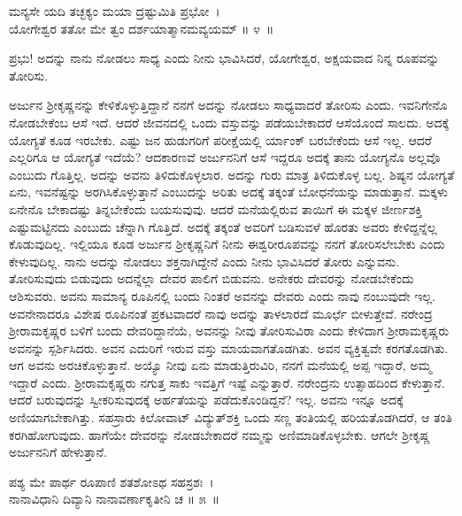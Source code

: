 \begin{shloka}
ಮನ್ಯಸೇ ಯದಿ ತಚ್ಛಕ್ಯಂ ಮಯಾ ದ್ರಷ್ಟುಮಿತಿ ಪ್ರಭೋ~।\\ಯೋಗೇಶ್ವರ ತತೋ ಮೇ ತ್ವಂ ದರ್ಶಯಾತ್ಮಾನಮವ್ಯಯಮ್ \hfill॥ ೪~॥
\end{shloka}

\begin{artha}
ಪ್ರಭು! ಅದನ್ನು ನಾನು ನೋಡಲು ಸಾಧ್ಯ ಎಂದು ನೀನು ಭಾವಿಸಿದರೆ, ಯೋಗೇಶ್ವರ, ಅಕ್ಷಯವಾದ ನಿನ್ನ ರೂಪವನ್ನು ತೋರಿಸು.
\end{artha}

ಅರ್ಜುನ ಶ‍್ರೀಕೃಷ್ಣನನ್ನು ಕೇಳಿಕೊಳ್ಳುತ್ತಿದ್ದಾನೆ ನನಗೆ ಅದನ್ನು ನೋಡಲು ಸಾಧ್ಯವಾದರೆ ತೋರಿಸು ಎಂದು. ಇವನಿಗೇನೊ ನೋಡಬೇಕೆಂಬ ಆಸೆ ಇದೆ. ಆದರೆ ಜೀವನದಲ್ಲಿ ಒಂದು ವಸ್ತುವನ್ನು ಪಡೆಯಬೇಕಾದರೆ ಆಸೆಯೊಂದೆ ಸಾಲದು. ಅದಕ್ಕೆ ಯೋಗ್ಯತೆ ಕೂಡ ಇರಬೇಕು. ಎಷ್ಟು ಜನ ಹುಡುಗರಿಗೆ ಪರೀಕ್ಷೆಯಲ್ಲಿ ರ್ಯಾಂಕ್ ಬರಬೇಕೆಂದು ಆಸೆ ಇಲ್ಲ. ಆದರೆ ಎಲ್ಲರಿಗೂ ಆ ಯೋಗ್ಯತೆ ಇದೆಯೆ? ಆದಕಾರಣವೆ ಅರ್ಜುನನಿಗೆ ಆಸೆ ಇದ್ದರೂ ಅದಕ್ಕೆ ತಾನು ಯೋಗ್ಯನೊ ಅಲ್ಲವೊ ಎಂಬುದು ಗೊತ್ತಿಲ್ಲ. ಅದನ್ನು ಅವನು ತಿಳಿದುಕೊಳ್ಳಲಾರ. ಅದನ್ನು ಗುರು ಮಾತ್ರ ತಿಳಿದುಕೊಳ್ಳ ಬಲ್ಲ. ಶಿಷ್ಯನ ಯೋಗ್ಯತೆ ಏನು, ಇವನೆಷ್ಟನ್ನು ಅರಗಿಸಿಕೊಳ್ಳುತ್ತಾನೆ ಎಂಬುದನ್ನು ಅರಿತು ಅದಕ್ಕೆ ತಕ್ಕಂತೆ ಬೋಧನೆಯನ್ನು ಮಾಡುತ್ತಾನೆ. ಮಕ್ಕಳು ಏನೇನೊ ಬೇಕಾದಷ್ಟು ತಿನ್ನಬೇಕೆಂದು ಬಯಸುವುವು. ಆದರೆ ಮನೆಯಲ್ಲಿರುವ ತಾಯಿಗೆ ಈ ಮಕ್ಕಳ ಜೀರ್ಣಶಕ್ತಿ ಎಷ್ಟುಮಟ್ಟಿನದು ಎಂಬುದು ಚೆನ್ನಾಗಿ ಗೊತ್ತಿದೆ. ಅದಕ್ಕೆ ತಕ್ಕಂತೆ ಅವರಿಗೆ ಬಡಿಸುವಳೆ ಹೊರತು ಅವರು ಕೇಳಿದ್ದನ್ನೆಲ್ಲ ಕೊಡುವುದಿಲ್ಲ. ಇಲ್ಲಿಯೂ ಕೂಡ ಅರ್ಜುನ ಶ‍್ರೀಕೃಷ್ಣನಿಗೆ ನೀನು ಈಶ್ವರೀರೂಪವನ್ನು ನನಗೆ ತೋರಿಸಲೇಬೇಕು ಎಂದು ಕೇಳುವುದಿಲ್ಲ. ನಾನು ಅದನ್ನು ನೋಡಲು ಶಕ್ತನಾಗಿದ್ದೇನೆ ಎಂದು ನೀನು ಭಾವಿಸಿದರೆ ತೋರು ಎನ್ನುವನು. ತೋರಿಸುವುದು ಬಿಡುವುದು ಅದನ್ನೆಲ್ಲಾ ದೇವರ ಪಾಲಿಗೆ ಬಿಡುವನು. ಅನೇಕರು ದೇವರನ್ನು ನೋಡಬೇಕೆಂದು ಆಶಿಸುವರು. ಅವನು ಸಾಮಾನ್ಯ ರೂಪಿನಲ್ಲಿ ಬಂದು ನಿಂತರೆ ಅವನನ್ನು ದೇವರು ಎಂದು ನಾವು ನಂಬುವುದೇ ಇಲ್ಲ. ಅವನೇನಾದರೂ ವಿಶೇಷ ರೂಪಿನಂತೆ ಪ್ರಕಟವಾದರೆ ನಾವು ಅದನ್ನು ತಾಳಲಾರದೆ ಮೂರ್ಛೆ ಬೀಳುತ್ತೇವೆ. ನರೇಂದ್ರ ಶ‍್ರೀರಾಮಕೃಷ್ಣರ ಬಳಿಗೆ ಬಂದು ದೇವರಿದ್ದಾನೆಯೆ, ಅವನನ್ನು ನೀವು ತೋರಿಸುವಿರಾ ಎಂದು ಕೇಳಿದಾಗ ಶ‍್ರೀರಾಮಕೃಷ್ಣರು ಅವನನ್ನು ಸ್ಪರ್ಶಿಸಿದರು. ಅವನ ಎದುರಿಗೆ ಇರುವ ವಸ್ತು ಮಾಯವಾಗತೊಡಗಿತು. ಅವನ ವ್ಯಕ್ತಿತ್ವವೇ ಕರಗತೊಡಗಿತು. ಆಗ ಅವನು ಅರಚಿಕೊಳ್ಳುತ್ತಾನೆ. ಅಯ್ಯೊ ನೀವು ಏನು ಮಾಡುತ್ತಿರುವಿರಿ, ನನಗೆ ಮನೆಯಲ್ಲಿ ಅಪ್ಪ ಇದ್ದಾರೆ, ಅಮ್ಮ ಇದ್ದಾರೆ ಎಂದು. ಶ‍್ರೀರಾಮಕೃಷ್ಣರು ನಗುತ್ತ ಸಾಕು ಇವತ್ತಿಗೆ ಇಷ್ಟೆ ಎನ್ನುತ್ತಾರೆ. ನರೇಂದ್ರನು ಉತ್ಸಾಹದಿಂದ ಕೇಳುತ್ತಾನೆ. ಆದರೆ ಬರುವುದನ್ನು ಸ್ವೀಕರಿಸುವುದಕ್ಕೆ ಅರ್ಹತೆಯನ್ನು ಪಡೆದುಕೊಂಡಿದ್ದನೆ? ಇಲ್ಲ. ಅವನು ಇನ್ನೂ ಅದಕ್ಕೆ ಅಣಿಯಾಗಬೇಕಾಗಿತ್ತು. ಸಹಸ್ರಾರು ಕಿಲೋವಾಟ್ ವಿದ್ಯುತ್​ಶಕ್ತಿ ಒಂದು ಸಣ್ಣ ತಂತಿಯಲ್ಲಿ ಹರಿಯತೊಡಗಿದರೆ, ಆ ತಂತಿ ಕರಗಿಹೋಗುವುದು. ಹಾಗೆಯೇ ದೇವರನ್ನು ನೋಡಬೇಕಾದರೆ ನಮ್ಮನ್ನು ಅಣಿಮಾಡಿಕೊಳ್ಳಬೇಕು. ಆಗಲೇ ಶ‍್ರೀಕೃಷ್ಣ ಅರ್ಜುನನಿಗೆ ಹೇಳುತ್ತಾನೆ.

\begin{shloka}
ಪಶ್ಯ ಮೇ ಪಾರ್ಥ ರೂಪಾಣಿ ಶತಶೋಽಥ ಸಹಸ್ರಶಃ~।\\ನಾನಾವಿಧಾನಿ ದಿವ್ಯಾನಿ ನಾನಾವರ್ಣಾಕೃತೀನಿ ಚ \hfill॥ ೫~॥
\end{shloka}

